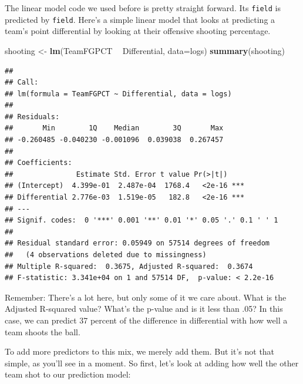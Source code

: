 \documentclass[]{book}
\newenvironment{Shaded}{\begin{snugshade}}{\end{snugshade}}
\newcommand{\KeywordTok}[1]{\textcolor[rgb]{0.13,0.29,0.53}{\textbf{#1}}}
\newcommand{\DataTypeTok}[1]{\textcolor[rgb]{0.13,0.29,0.53}{#1}}
\newcommand{\StringTok}[1]{\textcolor[rgb]{0.31,0.60,0.02}{#1}}
\newcommand{\OperatorTok}[1]{\textcolor[rgb]{0.81,0.36,0.00}{\textbf{#1}}}
\newcommand{\NormalTok}[1]{#1}
\begin{document}
\begin{Shaded}
\end{Shaded}

The linear model code we used before is pretty straight forward. Its
\texttt{field} is predicted by \texttt{field}. Here's a simple linear
model that looks at predicting a team's point differential by looking at
their offensive shooting percentage.

\begin{Shaded}
\begin{Highlighting}[]
\NormalTok{shooting <-}\StringTok{ }\KeywordTok{lm}\NormalTok{(TeamFGPCT }\OperatorTok{~}\StringTok{ }\NormalTok{Differential, }\DataTypeTok{data=}\NormalTok{logs)}
\KeywordTok{summary}\NormalTok{(shooting)}
\end{Highlighting}
\end{Shaded}

\begin{verbatim}
## 
## Call:
## lm(formula = TeamFGPCT ~ Differential, data = logs)
## 
## Residuals:
##       Min        1Q    Median        3Q       Max 
## -0.260485 -0.040230 -0.001096  0.039038  0.267457 
## 
## Coefficients:
##               Estimate Std. Error t value Pr(>|t|)    
## (Intercept)  4.399e-01  2.487e-04  1768.4   <2e-16 ***
## Differential 2.776e-03  1.519e-05   182.8   <2e-16 ***
## ---
## Signif. codes:  0 '***' 0.001 '**' 0.01 '*' 0.05 '.' 0.1 ' ' 1
## 
## Residual standard error: 0.05949 on 57514 degrees of freedom
##   (4 observations deleted due to missingness)
## Multiple R-squared:  0.3675, Adjusted R-squared:  0.3674 
## F-statistic: 3.341e+04 on 1 and 57514 DF,  p-value: < 2.2e-16
\end{verbatim}

Remember: There's a lot here, but only some of it we care about. What is
the Adjusted R-squared value? What's the p-value and is it less than
.05? In this case, we can predict 37 percent of the difference in
differential with how well a team shoots the ball.

To add more predictors to this mix, we merely add them. But it's not
that simple, as you'll see in a moment. So first, let's look at adding
how well the other team shot to our prediction model:
\end{document}
